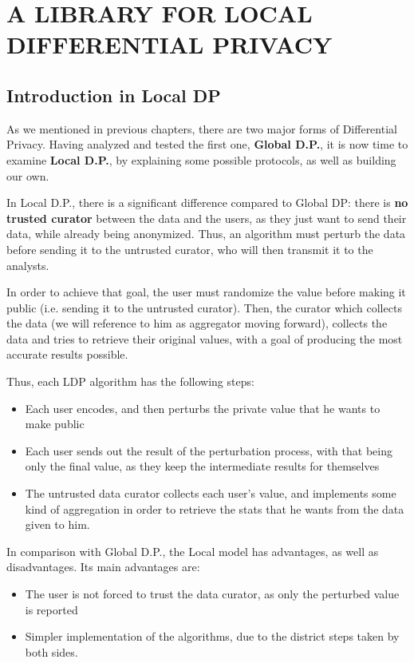 \chapter{A LIBRARY FOR LOCAL DIFFERENTIAL PRIVACY}

\section{Introduction in Local DP}

As we mentioned in previous chapters, there are two major forms of Differential Privacy. Having analyzed and tested the first one, \textbf{Global D.P.}, it is now time to examine \textbf{Local D.P.}, by explaining some possible protocols, as well as building our own.


In Local D.P., there is a significant difference compared to Global DP: there is \textbf{no trusted curator} between the data and the users, as they just want to send their data, while already being anonymized. Thus, an algorithm must perturb the data before sending it to the untrusted curator, who will then transmit it to the analysts. 

In order to achieve that goal, the user must randomize the value before making it public (i.e. sending it to the untrusted curator). Then, the curator which collects the data (we will reference to him as aggregator moving forward), collects the data and tries to retrieve their original values, with a goal of producing the most accurate results possible. 

Thus, each LDP algorithm has the following steps:

\begin{itemize}
    \item Each user encodes, and then perturbs the private value that he wants to make public
    \item Each user sends out the result of the perturbation process, with that being only the final value, as they keep the intermediate results for themselves
    \item The untrusted data curator collects each user's value, and implements some kind of aggregation in order to retrieve the stats that he wants from the data given to him.
\end{itemize}

In comparison with Global D.P., the Local model has advantages, as well as disadvantages. 
Its main advantages are:
\begin{itemize}
    \item The user is not forced to trust the data curator, as only the perturbed value is reported
    \item Simpler implementation of the algorithms, due to the district steps taken by both sides.
\end{itemize}

